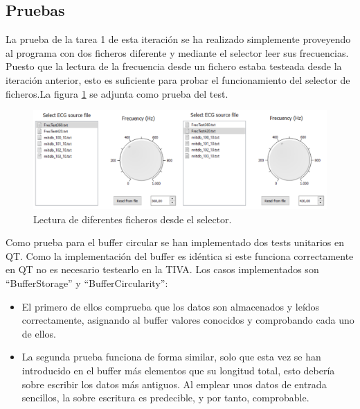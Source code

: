     \subsection{Pruebas}
        
        La prueba de la tarea 1 de esta iteración se ha realizado simplemente proveyendo al programa con dos ficheros diferente y mediante el selector leer sus frecuencias. Puesto que la lectura de la frecuencia desde un fichero estaba testeada desde la iteración anterior, esto es suficiente para probar el funcionamiento del selector de ficheros.La figura \ref{fig:fileSelectorTest} se adjunta como prueba del test.

        \begin{figure}[H]
                \centering
                        \includegraphics[width = \linewidth]{figuras/FileSelectorTest.png}
                \caption{Lectura de diferentes ficheros desde el selector.}
                \label{fig:fileSelectorTest}
        \end{figure}

        \clearpage
        Como prueba para el buffer circular se han implementado dos tests unitarios en QT. Como la implementación del buffer es idéntica si este funciona correctamente en QT no es necesario testearlo en la TIVA. Los casos implementados son ``BufferStorage'' y ``BufferCircularity'': 
        
        \begin{itemize}
            \item El primero de ellos comprueba que los datos son almacenados y leídos correctamente, asignando al buffer valores conocidos y comprobando cada uno de ellos. 
            \item La segunda prueba funciona de forma similar, solo que esta vez se han introducido en el buffer más elementos que su longitud total, esto debería sobre escribir los datos más antiguos. Al emplear unos datos de entrada sencillos, la sobre escritura es predecible, y por tanto, comprobable.
        \end{itemize}
        
